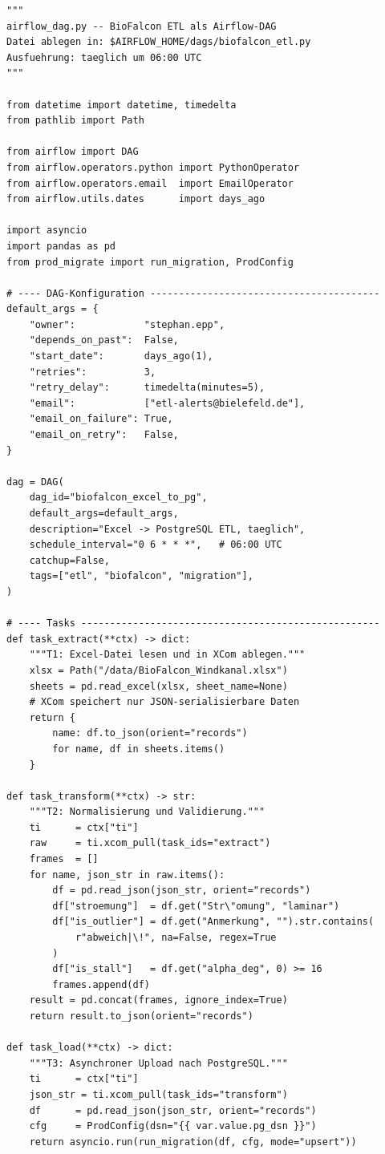 \documentclass[12pt,a4paper]{report}
\theoremstyle{definition}
\theoremstyle{remark}
\begin{document}
\begin{lstlisting}[style=python, caption={airflow\_dag.py: ETL-Pipeline als Airflow-DAG}, label=lst:airflow]
"""
airflow_dag.py -- BioFalcon ETL als Airflow-DAG
Datei ablegen in: $AIRFLOW_HOME/dags/biofalcon_etl.py
Ausfuehrung: taeglich um 06:00 UTC
"""

from datetime import datetime, timedelta
from pathlib import Path

from airflow import DAG
from airflow.operators.python import PythonOperator
from airflow.operators.email  import EmailOperator
from airflow.utils.dates      import days_ago

import asyncio
import pandas as pd
from prod_migrate import run_migration, ProdConfig

# ---- DAG-Konfiguration ----------------------------------------
default_args = {
    "owner":            "stephan.epp",
    "depends_on_past":  False,
    "start_date":       days_ago(1),
    "retries":          3,
    "retry_delay":      timedelta(minutes=5),
    "email":            ["etl-alerts@bielefeld.de"],
    "email_on_failure": True,
    "email_on_retry":   False,
}

dag = DAG(
    dag_id="biofalcon_excel_to_pg",
    default_args=default_args,
    description="Excel -> PostgreSQL ETL, taeglich",
    schedule_interval="0 6 * * *",   # 06:00 UTC
    catchup=False,
    tags=["etl", "biofalcon", "migration"],
)

# ---- Tasks ----------------------------------------------------
def task_extract(**ctx) -> dict:
    """T1: Excel-Datei lesen und in XCom ablegen."""
    xlsx = Path("/data/BioFalcon_Windkanal.xlsx")
    sheets = pd.read_excel(xlsx, sheet_name=None)
    # XCom speichert nur JSON-serialisierbare Daten
    return {
        name: df.to_json(orient="records")
        for name, df in sheets.items()
    }

def task_transform(**ctx) -> str:
    """T2: Normalisierung und Validierung."""
    ti      = ctx["ti"]
    raw     = ti.xcom_pull(task_ids="extract")
    frames  = []
    for name, json_str in raw.items():
        df = pd.read_json(json_str, orient="records")
        df["stroemung"]  = df.get("Str\"omung", "laminar")
        df["is_outlier"] = df.get("Anmerkung", "").str.contains(
            r"abweich|\!", na=False, regex=True
        )
        df["is_stall"]   = df.get("alpha_deg", 0) >= 16
        frames.append(df)
    result = pd.concat(frames, ignore_index=True)
    return result.to_json(orient="records")

def task_load(**ctx) -> dict:
    """T3: Asynchroner Upload nach PostgreSQL."""
    ti      = ctx["ti"]
    json_str = ti.xcom_pull(task_ids="transform")
    df      = pd.read_json(json_str, orient="records")
    cfg     = ProdConfig(dsn="{{ var.value.pg_dsn }}")
    return asyncio.run(run_migration(df, cfg, mode="upsert"))


\end{lstlisting}
\end{document}
